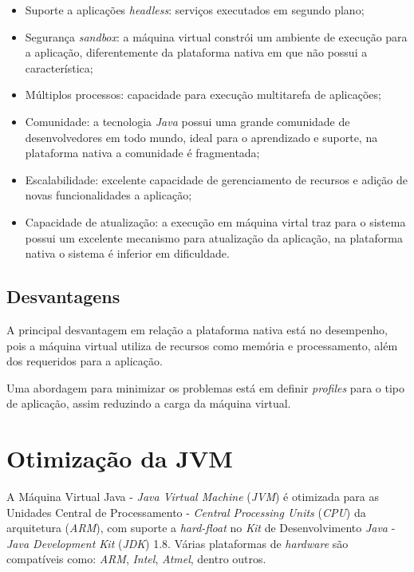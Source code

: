 \begin{itemize}

    \item Suporte a aplicações \textit{headless}: serviços executados em
    segundo plano;

    \item Segurança \textit{sandbox}: a máquina virtual constrói um ambiente de
    execução para a aplicação, diferentemente da plataforma nativa em que não
    possui a característica;

    \item Múltiplos processos: capacidade para execução multitarefa de
    aplicações;

    \item Comunidade: a tecnologia \textit{Java} possui uma grande comunidade
    de desenvolvedores em todo mundo, ideal para o aprendizado e suporte, na
    plataforma nativa a comunidade é fragmentada;

    \item Escalabilidade: excelente capacidade de gerenciamento de recursos e
    adição de novas funcionalidades a aplicação;

    \item Capacidade de atualização: a execução em máquina virtal traz para o
    sistema possui um excelente mecanismo para atualização da aplicação, na
    plataforma nativa o sistema é inferior em dificuldade.

\end{itemize}

\subsection{Desvantagens}

A principal desvantagem em relação a plataforma nativa está no desempenho, pois
a máquina virtual utiliza de recursos como memória e processamento, além dos
requeridos para a aplicação.

Uma abordagem para minimizar os problemas está em definir \textit{profiles}
para o tipo de aplicação, assim reduzindo a carga da máquina virtual.

\section{Otimização da JVM}

A Máquina Virtual Java - \textit{Java Virtual Machine} (\textit{JVM}) é
otimizada para as Unidades Central de Processamento - \textit{Central
  Processing Units} (\textit{CPU}) da arquitetura (\textit{ARM}), com suporte a
\textit{hard-float} no \textit{Kit} de Desenvolvimento \textit{Java} -
\textit{Java Development Kit} (\textit{JDK}) 1.8. Várias plataformas de
\textit{hardware} são compatíveis como: \textit{ARM}, \textit{Intel},
\textit{Atmel}, dentro outros.
